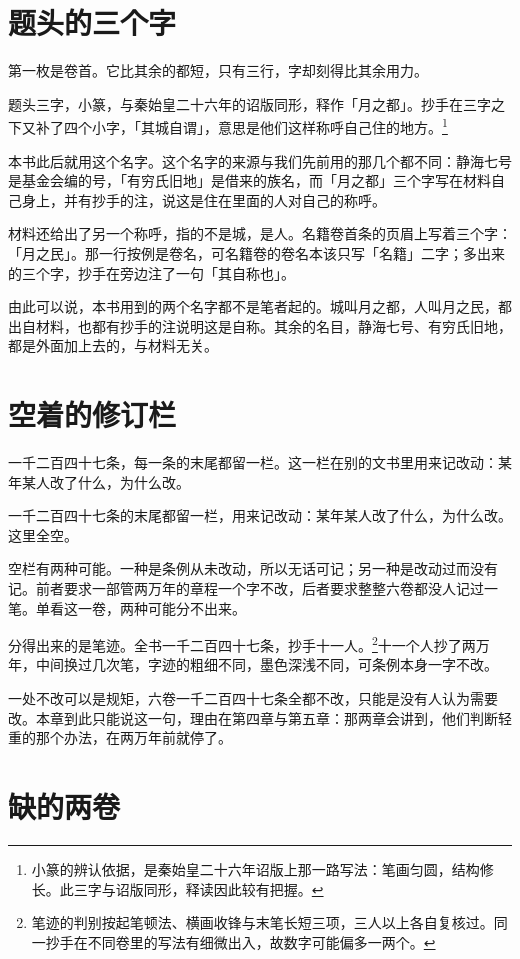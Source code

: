\section{题头的三个字}

第一枚是卷首。它比其余的都短，只有三行，字却刻得比其余用力。

题头三字，小篆，与秦始皇二十六年的诏版同形，释作「月之都」。抄手在三字之下又补了四个小字，「其城自谓」，意思是他们这样称呼自己住的地方。\footnote{小篆的辨认依据，是秦始皇二十六年诏版上那一路写法：笔画匀圆，结构修长。此三字与诏版同形，释读因此较有把握。}

本书此后就用这个名字。这个名字的来源与我们先前用的那几个都不同：静海七号是基金会编的号，「有穷氏旧地」是借来的族名，而「月之都」三个字写在材料自己身上，并有抄手的注，说这是住在里面的人对自己的称呼。

材料还给出了另一个称呼，指的不是城，是人。名籍卷首条的页眉上写着三个字：「月之民」。那一行按例是卷名，可名籍卷的卷名本该只写「名籍」二字；多出来的三个字，抄手在旁边注了一句「其自称也」。

由此可以说，本书用到的两个名字都不是笔者起的。城叫月之都，人叫月之民，都出自材料，也都有抄手的注说明这是自称。其余的名目，静海七号、有穷氏旧地，都是外面加上去的，与材料无关。

\section{空着的修订栏}

一千二百四十七条，每一条的末尾都留一栏。这一栏在别的文书里用来记改动：某年某人改了什么，为什么改。

一千二百四十七条的末尾都留一栏，用来记改动：某年某人改了什么，为什么改。这里全空。

空栏有两种可能。一种是条例从未改动，所以无话可记；另一种是改动过而没有记。前者要求一部管两万年的章程一个字不改，后者要求整整六卷都没人记过一笔。单看这一卷，两种可能分不出来。

分得出来的是笔迹。全书一千二百四十七条，抄手十一人。\footnote{笔迹的判别按起笔顿法、横画收锋与末笔长短三项，三人以上各自复核过。同一抄手在不同卷里的写法有细微出入，故数字可能偏多一两个。}十一个人抄了两万年，中间换过几次笔，字迹的粗细不同，墨色深浅不同，可条例本身一字不改。

一处不改可以是规矩，六卷一千二百四十七条全都不改，只能是没有人认为需要改。本章到此只能说这一句，理由在第四章与第五章：那两章会讲到，他们判断轻重的那个办法，在两万年前就停了。

\section{缺的两卷}

